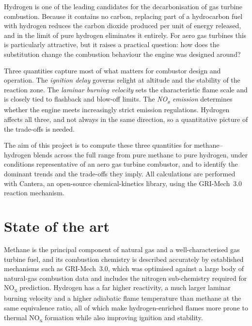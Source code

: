 \documentclass[11pt,a4paper]{article}
\begin{document}
Hydrogen is one of the leading candidates for the decarbonisation of gas
turbine combustion. Because it contains no carbon, replacing part of a
hydrocarbon fuel with hydrogen reduces the carbon dioxide produced per unit
of energy released, and in the limit of pure hydrogen eliminates it entirely.
For aero gas turbines this is particularly attractive, but it raises a
practical question: how does the substitution change the combustion
behaviour the engine was designed around?

Three quantities capture most of what matters for combustor design and
operation. The \emph{ignition delay} governs relight at altitude and the
stability of the reaction zone. The \emph{laminar burning velocity} sets the
characteristic flame scale and is closely tied to flashback and blow-off
limits. The \emph{NO\textsubscript{x} emission} determines whether the engine
meets increasingly strict emission regulations. Hydrogen affects all three,
and not always in the same direction, so a quantitative picture of the
trade-offs is needed.

The aim of this project is to compute these three quantities for
methane--hydrogen blends across the full range from pure methane to pure
hydrogen, under conditions representative of an aero gas turbine combustor,
and to identify the dominant trends and the trade-offs they imply. All
calculations are performed with Cantera, an open-source chemical-kinetics
library, using the GRI-Mech~3.0 reaction mechanism.

\section{State of the art}

Methane is the principal component of natural gas and a well-characterised
gas turbine fuel, and its combustion chemistry is described accurately by
established mechanisms such as GRI-Mech~3.0, which was optimised against a
large body of natural-gas combustion data and includes the nitrogen
sub-chemistry required for NO\textsubscript{x} prediction. Hydrogen has a far
higher reactivity, a much larger laminar burning velocity and a higher
adiabatic flame temperature than methane at the same equivalence ratio, all
of which make hydrogen-enriched flames more prone to thermal
NO\textsubscript{x} formation while also improving ignition and stability.
\end{document}
